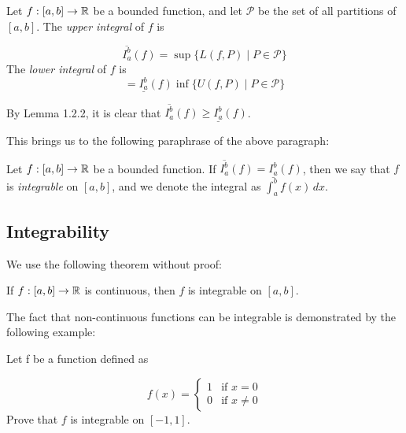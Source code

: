 \documentclass{article}
\begin{document}
  \begin{defi}
    Let \(f: [a,b] \to \mathbb{R}\) be a bounded function, and let \(\mathcal{P}\) be the set of all partitions of \([a,b]\). The \emph{upper integral} of \(f\) is

    \[
      \overline{I_{a}^{b}}(f) = \sup\{L(f, P) \mid P \in \mathcal{P}\}
    \]
    The \emph{lower integral} of \(f\) is
    \[
       =\underline{I_{a}^{b}}(f) \inf\{U(f, P) \mid P \in \mathcal{P}\}
    \]
  \end{defi}

  \begin{remark}
    By Lemma 1.2.2, it is clear that \(\overline{I_{a}^{b}}(f) \geq \underline{I_{a}^{b}}(f)\).
  \end{remark}

  This brings us to the following paraphrase of the above paragraph:

  \begin{defi}[Integrability]
    Let \(f: [a,b] \to \mathbb{R}\) be a bounded function. If \(\overline{I_{a}^{b}}(f) = \underline{I_{a}^{b}}(f)\), then we say that \(f\) is \emph{integrable} on \([a,b]\), and we denote the integral as \(\int_{a}^{b}{f(x) \,dx}\).
  \end{defi}


\subsection{Integrability}

  We use the following theorem without proof:

  \begin{thm}
    If \(f:[a,b] \to \mathbb{R}\) is continuous, then \(f\) is integrable on \([a,b]\).
  \end{thm}

  The fact that non-continuous functions can be integrable is demonstrated by the following example:

  \begin{eg}
    Let f be a function defined as 

    \[
      f(x) = \begin{cases}
        1 & \text{if } x = 0 \\
        0 & \text{if } x \neq 0
      \end{cases}
    \]
    Prove that \(f\) is integrable on \([-1,1]\).
  \end{eg}
\end{document}
